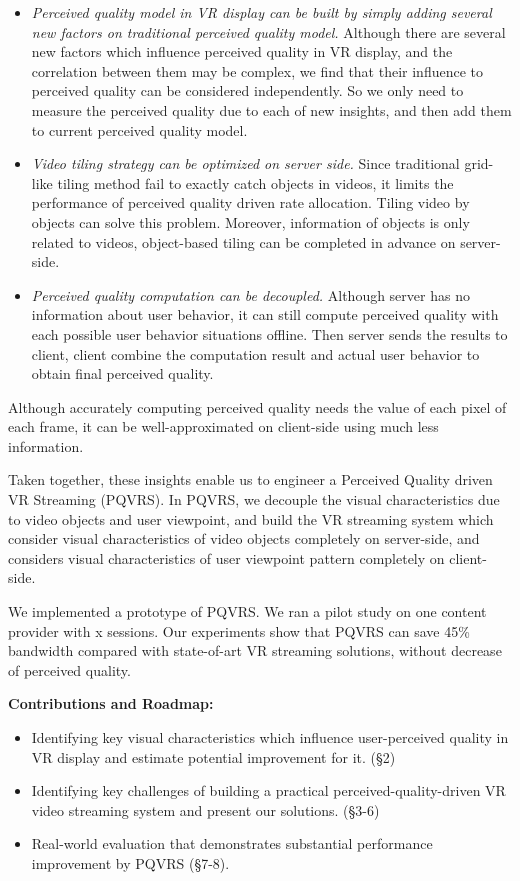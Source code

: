 \begin{itemize}

\item \emph{Perceived quality model in VR display can be built by simply adding several new factors on traditional perceived quality model.} Although there are several new factors which influence perceived quality in VR display, and the correlation between them may be complex, we find that their influence to perceived quality can be considered independently. So we only need to measure the perceived quality due to each of new insights, and then add them to current perceived quality model.

\item \emph{Video tiling strategy can be optimized on server side.} Since traditional grid-like tiling method fail to exactly catch objects in videos, it limits the performance of perceived quality driven rate allocation. Tiling video by objects can solve this problem. Moreover, information of objects is only related to videos, object-based tiling can be completed in advance on server-side.

\item \emph{Perceived quality computation can be decoupled.} Although server has no information about user behavior, it can still compute perceived quality with each possible user behavior situations offline. Then server sends the results to client, client combine the computation result and actual user behavior to obtain final perceived quality.

\end{itemize}

Although accurately computing perceived quality needs the value of each pixel of each frame, it can be well-approximated on client-side using much less information.

Taken together, these insights enable us to engineer a Perceived Quality driven VR Streaming (PQVRS). In PQVRS, we decouple the visual characteristics due to video objects and user viewpoint, and build the VR streaming system which consider visual characteristics of video objects completely on server-side, and considers visual characteristics of user viewpoint pattern completely on client-side.

We implemented a prototype of PQVRS. We ran a pilot study on one content provider with x sessions. Our experiments show that PQVRS can save 45\% bandwidth compared with state-of-art VR streaming solutions, without decrease of perceived quality.

\textbf{Contributions and Roadmap:}
\begin{itemize}
\item Identifying key visual characteristics which influence user-perceived quality in VR display and estimate potential improvement for it. (\S 2)
\item Identifying key challenges of building a practical perceived-quality-driven VR video streaming system and present our solutions. (\S 3-6)
\item Real-world evaluation that demonstrates substantial performance improvement by PQVRS (\S 7-8).
\end{itemize}
